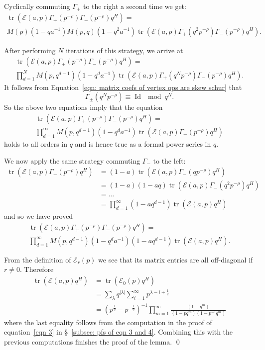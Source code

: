 \documentclass[12pt]{amsart}
\newcommand{\half}{\frac{1}{2}}
\theoremstyle{definition}
\newcommand{\tr}{\operatorname{tr}}
\newcommand{\E}{\mathcal{E}}
\newcommand{\ptotheminusrho}{p^{-\rho}}
\begin{document}
Cyclically commuting $\Gamma_{+}$ to the right a second time we get:
\begin{multline*}
 \tr (\E (a,p)\Gamma_{+}(\ptotheminusrho)\Gamma_{-}(\ptotheminusrho
)q^{H}) = \\
M(p)(1-qa^{-1})M(p,q)(1-q^{2}a^{-1}) \tr (\E (a,p)\Gamma_{+}(q^{2}\ptotheminusrho)\Gamma_{-}(\ptotheminusrho
)q^{H}).
\end{multline*}

After performing $N$ iterations of this strategy, we arrive at
\begin{multline*}
 \tr (\E (a,p)\Gamma_{+}(\ptotheminusrho)\Gamma_{-}(\ptotheminusrho
)q^{H}) = \\
\prod_{d=1}^{N}M(p,q^{d-1})(1-q^{d}a^{-1}) \tr (\E (a,p)\Gamma_{+}(q^{N}\ptotheminusrho)\Gamma_{-}(\ptotheminusrho
)q^{H}).
\end{multline*}
It follows from Equation~\eqref{eqn: matrix coefs of vertex ops are
skew schur} that 
\[
\Gamma_{\pm}(q^{N}\ptotheminusrho )\equiv \operatorname{Id} \mod q^{N}.
\]
So the above two equations imply that the equation
\begin{multline*}
 \tr (\E (a,p)\Gamma_{+}(\ptotheminusrho)\Gamma_{-}(\ptotheminusrho
)q^{H}) = \\
\prod_{d=1}^{\infty }M(p,q^{d-1})(1-q^{d}a^{-1}) \tr (\E (a,p)\Gamma_{-}(\ptotheminusrho
)q^{H})
\end{multline*}
holds to all orders in $q$ and is hence true as a formal power series
in $q$.

We now apply the same strategy commuting $\Gamma_{-}$ to the left:
\begin{align*}
\tr (\E (a,p)\Gamma_{-}(\ptotheminusrho )q^{H}) &=(1-a)\tr (\E (a,p)\Gamma_{-}(q\ptotheminusrho )q^{H}) \\
&=(1-a)(1-aq)\tr (\E (a,p)\Gamma_{-}(q^{2}\ptotheminusrho )q^{H}) \\
&=\dots \\
&=\prod_{d=1}^{\infty}(1-aq^{d-1})\tr (\E (a,p)q^{H})
\end{align*}
and so we have proved
\begin{multline*}
 \tr (\E (a,p)\Gamma_{+}(\ptotheminusrho)\Gamma_{-}(\ptotheminusrho
)q^{H}) = \\
\prod_{d=1}^{\infty }M(p,q^{d-1})(1-q^{d}a^{-1})(1-aq^{d-1})\tr (\E (a,p)q^{H}).
\end{multline*}


From the definition of $\E_{r}(p)$ we see that its matrix entries are
all off-diagonal if $r\neq 0$. Therefore
\begin{align*}
\tr (\E (a,p) q^{H})&=\tr (\E_{0}(p)q^{H})\\
&= \sum_{\lambda} q^{|\lambda |}\sum_{i=1}^{\infty}p^{\lambda -i+\half}\\
&=(p^{\half}-p^{-\half})^{-1}\prod_{m=1}^{\infty} \frac{(1-q^{m})}{(1-pq^{m})(1-p^{-1}q^{m})}
\end{align*}
where the last equality follows from the computation in the proof of
equation~\eqref{eqn 3} in \S~\ref{subsec: pfs of eqn 3 and
4}. Combining this with the previous computations finishes the proof
of the lemma. \qed
\end{document}
